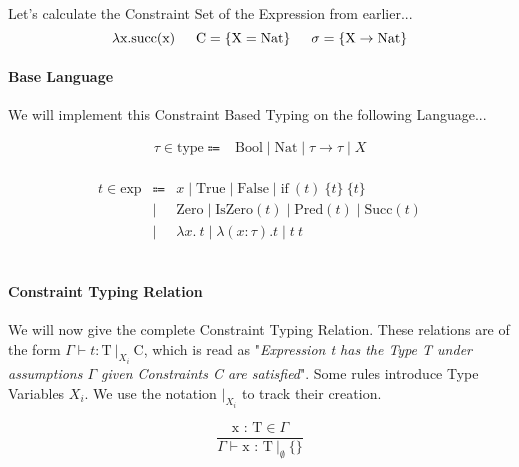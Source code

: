 \documentclass{article}
\begin{document}
\noindent Let's calculate the Constraint Set of the Expression from earlier...
\begin{equation*}
    \lambda\text{x}.\text{succ}(\text{x})\indent
    \text{C} = \{\text{X} = \text{Nat}\}\indent
    \sigma = \{\text{X} \to \text{Nat}\}
\end{equation*}

\paragraph{Base Language} 
We will implement this Constraint Based Typing on the following Language...

\begin{equation*}
  \begin{array}{rcl}
    \tau \in \text{type} \Coloneqq & \text{Bool} \mid \text{Nat} \mid \tau \to \tau \mid X \\
  \end{array}
\end{equation*}

\begin{equation*}
  \begin{array}{rcl}
    t \in \text{exp} & \Coloneqq & x \mid \text{True} \mid \text{False} \mid \text{if} \ (t) \ \{t\} \ \{t\} \\
      & \mid      & \text{Zero} \mid \text{IsZero}(t) \mid \text{Pred}(t) \mid \text{Succ}(t) \\
      & \mid      & \lambda x . \ t \mid \lambda (x:\tau).t \mid t \ t
  \end{array}
\end{equation*}
\\
\paragraph{Constraint Typing Relation}
We will now give the complete Constraint Typing Relation. These relations are of the form $\Gamma \vdash t : \text{T} \ |_{X_{i}} \ \text{C}$, which is read as "\textit{Expression t has the Type T under assumptions $\Gamma$ given Constraints C are satisfied}". Some rules introduce Type Variables $X_{i}$. We use the notation $|_{X_{i}}$ to track their creation.


\begin{equation}
    \frac{\text{x : T} \in \Gamma}{\Gamma \vdash \text{x : T} \ |_{\emptyset} \ \{\}}
    \tag{Var}
\end{equation}
\end{document}
